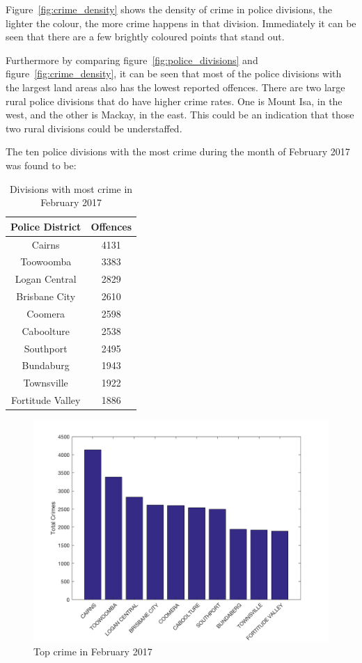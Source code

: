 \documentclass[]{article}
\begin{document}
Figure~\ref{fig:crime_density} shows the density of crime in police divisions, the lighter the colour, the more crime happens in that division.
Immediately it can be seen that there are a few brightly coloured points that stand out.

Furthermore by comparing figure~\ref{fig:police_divisions} and figure~\ref{fig:crime_density}, it can be seen that most of the police divisions with the largest land areas also has the lowest reported offences.
There are two large rural police divisions that do have higher crime rates. One is Mount Isa, in the west, and the other is Mackay, in the east. This could be an indication that those two rural divisions could be understaffed.

The ten police divisions with the most crime during the month of February 2017 was found to be:

\begin{table}[H]
    \caption{Divisions with most crime in February 2017}
    \centering
    \begin{tabular}{|c|c|}
        \hline
        Police District & Offences \\
        \hline
        Cairns & 4131 \\
        Toowoomba & 3383 \\
        Logan Central & 2829 \\
        Brisbane City & 2610 \\
        Coomera & 2598 \\
        Caboolture & 2538 \\
        Southport & 2495 \\
        Bundaburg & 1943 \\
        Townsville & 1922 \\
        Fortitude Valley & 1886 \\
        \hline
    \end{tabular}
\end{table}

\begin{figure}[H]
    \caption{Top crime in February 2017}
    \centering
    \includegraphics[width=\linewidth]{../images/top_crime_2017}
\end{figure}
\end{document}
